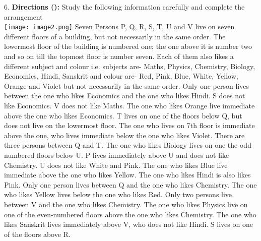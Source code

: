\documentclass[
]{article}
\begin{document}
6. \textbf{Directions ():} Study the following information carefully and complete the arrangement\\
\texttt{[image: image2.png]}
Seven Persons P, Q, R, S, T, U and V live on seven different floors of a building, but not
necessarily in the same order. The lowermost floor of the building is numbered one; the one
above it is number two and so on till the topmost floor is number seven. Each of them also
likes a different subject and colour i.e. subjects are- Maths, Physics, Chemistry, Biology,
Economics, Hindi, Sanskrit and colour are- Red, Pink, Blue, White, Yellow, Orange and
Violet but not necessarily in the same order. Only one person lives between the one who
likes Economics and the one who likes Hindi. S does not like Economics. V does not like
Maths. The one who likes Orange live immediate above the one who likes Economics. T
lives on one of the floors below Q, but does not live on the lowermost floor. The one who
lives on 7th floor is immediate above the one, who lives immediate below the one who likes
Violet. There are three persons between Q and T. The one who likes Biology lives on one the
odd numbered floors below U. P lives immediately above U and does not like Chemistry. U
does not like White and Pink. The one who likes Blue live immediate above the one who
likes Yellow. The one who likes Hindi is also likes Pink. Only one person lives between Q
and the one who likes Chemistry. The one who likes Yellow lives below the one who likes
Red. Only two persons live between V and the one who likes Chemistry. The one who likes
Physics live on one of the even-numbered floors above the one who likes Chemistry. The
one who likes Sanskrit lives immediately above V, who does not like Hindi. S lives on one of
the floors above R.\\
\end{document}

